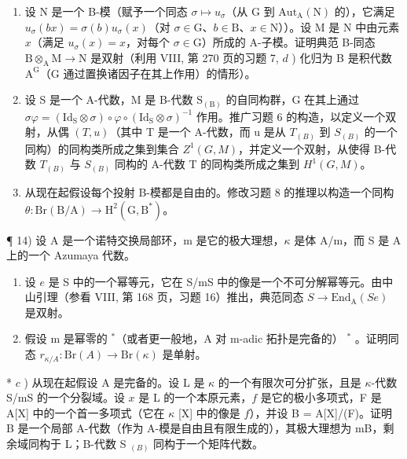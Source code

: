 \begin{enumerate}
\def\labelenumi{\alph{enumi})}
\item
  设 N 是一个 B-模（赋予一个同态 \(\sigma \mapsto u_{\sigma}\)（从 G 到 \(\mathrm{Aut}_{\mathrm{A}}(\mathrm{N})\) 的），它满足 \(u_{\sigma}(bx) = \sigma(b)u_{\sigma}(x)\)（对 \(\sigma \in \mathrm{G}\)、\(b \in \mathrm{B}\)、\(x \in \mathrm{N}\)））。设 M 是 N 中由元素 \(x\)（满足 \(u_{\sigma}(x) = x\)，对每个 \(\sigma \in \mathrm{G}\)）所成的 A-子模。证明典范 B-同态 \(\mathrm{B} \otimes_{\mathrm{A}} \mathrm{M} \to \mathrm{N}\) 是双射（利用 VIII, 第 270 页的习题 7, \(d\) ) 化归为 B 是积代数 \(\mathrm{A}^{\mathrm{G}}\)（G 通过置换诸因子在其上作用）的情形）。
\item
  设 S 是一个 A-代数，M 是 B-代数 \(\mathrm{S}_{(\mathrm{B})}\) 的自同构群，G 在其上通过 \(\sigma\varphi = (\mathrm{Id}_{\mathrm{S}} \otimes \sigma) \circ \varphi \circ (\mathrm{Id}_{\mathrm{S}} \otimes \sigma)^{-1}\) 作用。推广习题 6 的构造，以定义一个双射，从偶 \((T,u)\)（其中 T 是一个 A-代数，而 u 是从 \(T_{(B)}\) 到 \(S_{(B)}\) 的一个同构）的同构类所成之集到集合 \(Z^{1}(G,M)\)，并定义一个双射，从使得 B-代数 \(T_{(B)}\) 与 \(S_{(B)}\) 同构的 A-代数 T 的同构类所成之集到 \(H^{1}(G,M)\)。
\item
  从现在起假设每个投射 B-模都是自由的。修改习题 8 的推理以构造一个同构 \(\theta : \mathrm{Br}(\mathrm{B} / \mathrm{A}) \to \mathrm{H}^2(\mathrm{G}, \mathrm{B}^*)\)。
\end{enumerate}

¶ 14) 设 A 是一个诺特交换局部环，m 是它的极大理想，\(\kappa\) 是体 A/m，而 S 是 A 上的一个 Azumaya 代数。

\begin{enumerate}
\def\labelenumi{\alph{enumi})}
\item
  设 \(e\) 是 S 中的一个幂等元，它在 S/mS 中的像是一个不可分解幂等元。由中山引理（参看 VIII, 第 168 页，习题 16）推出，典范同态 \(S \to \mathrm{End}_{\mathrm{A}}(Se)\) 是双射。
\item
  假设 m 是幂零的 \(^{*}\)（或者更一般地，A 对 m-adic 拓扑是完备的） \(^{*}\) 。证明同态 \(r_{\kappa/A}: \mathrm{Br}(A) \to \mathrm{Br}(\kappa)\) 是单射。
\end{enumerate}

* \(c\) ) 从现在起假设 A 是完备的。设 L 是 \(\kappa\) 的一个有限次可分扩张，且是 \(\kappa\)-代数 S/mS 的一个分裂域。设 \(x\) 是 L 的一个本原元素，\(f\) 是它的极小多项式，F 是 A{[}X{]} 中的一个首一多项式（它在 \(\kappa\) {[}X{]} 中的像是 \(f\)），并设 B = A{[}X{]}/(F)。证明 B 是一个局部 A-代数（作为 A-模是自由且有限生成的），其极大理想为 mB，剩余域同构于 L；B-代数 S \(_{(B)}\) 同构于一个矩阵代数。


